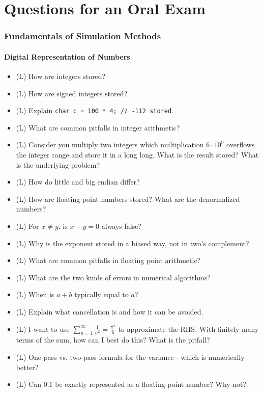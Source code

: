 \part{Questions for an Oral Exam}
\thispagestyle{plain}

\section{Fundamentals of Simulation Methods}

\subsection*{Digital Representation of Numbers}

\begin{itemize}
    \item (L) How are integers stored?
    \answerboxS
    \item (L) How are signed integers stored?
    \answerboxS
    \item (L) Explain \texttt{char c = 100 * 4; // -112 stored}.
    \answerboxS
    \item (L) What are common pitfalls in integer arithmetic?
    \answerboxM
    \item (L) Consider you multiply two integers which multiplication
    $6\cdot 10^9$ overflows the integer range and store it in a long long.
    What is the result stored? What is the underlying problem?
    \answerboxS
    \item (L) How do little and big endian differ?
    \answerboxS
    \item (L) How are floating point numbers stored? What are the denormalized numbers?
    \answerboxL
    \item (L) For $x\neq y$, is $x-y = 0$ always false?
    \answerboxS
    \item (L) Why is the exponent stored in a biased way, not in two's complement?
    \answerboxS
    \item (L) What are common pitfalls in floating point arithmetic?
    \answerboxM
    \item (L) What are the two kinds of errors in numerical algorithms?
    \answerboxS
    \item (L) When is $a + b$ typically equal to $a$?
    \answerboxS
    \item (L) Explain what cancellation is and how it can be avoided.
    \answerboxM
    \item (L) I want to use $\sum_{n=1}^{\infty} \frac{1}{n^2} = \frac{\pi^2}{6}$ to approximate
    the RHS. With finitely many terms of the sum, how can I best do this? What is the pitfall?
    \answerboxS
    \item (L) One-pass vs. two-pass formula for the variance - which is numerically better?
    \answerboxS
    \item (L) Can $0.1$ be exactly represented as a floating-point number? Why not?
    \answerboxS
\end{itemize}

